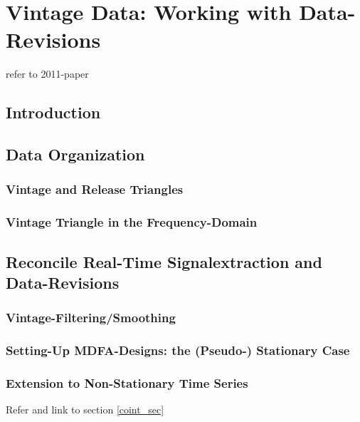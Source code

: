 \documentclass[a4paper]{book}
\begin{document}
\chapter{Vintage Data: Working with Data-Revisions}
\label{vintages_triangle_revision}
\label{fil_sec}

refer to 2011-paper
\section{Introduction}

\section{Data Organization}

\subsection{Vintage and Release Triangles}

\subsection{Vintage Triangle in the Frequency-Domain}


\section{Reconcile Real-Time Signalextraction and Data-Revisions}

\subsection{Vintage-Filtering/Smoothing}

\subsection{Setting-Up MDFA-Designs: the (Pseudo-) Stationary Case}

\subsection{Extension to Non-Stationary Time Series}\label{rev_sec_int}

Refer and link to section \ref{coint_sec}


\end{document}
